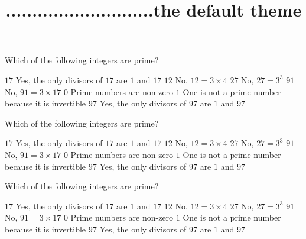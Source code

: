 \documentclass[theme=default]{webquiz}
\title{............................the default theme}
\begin{document}
  \begin{question}     %
     Which of the following integers are prime?
     \begin{choice}[multiple, columns=3]
       \correct   $17$ \feedback Yes, the only divisors of $17$ are $1$ and $17$
       \incorrect $12$ \feedback No, $12 = 3\times 4$
       \incorrect $27$ \feedback No, $27=3^3$
       \incorrect $91$ \feedback No, $91 = 3\times 17$
       \incorrect  $0$ \feedback Prime numbers are non-zero
       \incorrect  $1$ \feedback One is not a prime number because it is invertible
       \correct   $97$ \feedback Yes, the only divisors of $97$ are $1$ and $97$
     \end{choice}
  \end{question}

  \begin{question}     %
     Which of the following integers are prime?
     \begin{choice}[multiple, columns=3]
       \correct   $17$ \feedback Yes, the only divisors of $17$ are $1$ and $17$
       \incorrect $12$ \feedback No, $12 = 3\times 4$
       \incorrect $27$ \feedback No, $27=3^3$
       \incorrect $91$ \feedback No, $91 = 3\times 17$
       \incorrect  $0$ \feedback Prime numbers are non-zero
       \incorrect  $1$ \feedback One is not a prime number because it is invertible
       \correct   $97$ \feedback Yes, the only divisors of $97$ are $1$ and $97$
     \end{choice}
  \end{question}

  \begin{question}     %
     Which of the following integers are prime?
     \begin{choice}[multiple, columns=3]
       \correct   $17$ \feedback Yes, the only divisors of $17$ are $1$ and $17$
       \incorrect $12$ \feedback No, $12 = 3\times 4$
       \incorrect $27$ \feedback No, $27=3^3$
       \incorrect $91$ \feedback No, $91 = 3\times 17$
       \incorrect  $0$ \feedback Prime numbers are non-zero
       \incorrect  $1$ \feedback One is not a prime number because it is invertible
       \correct   $97$ \feedback Yes, the only divisors of $97$ are $1$ and $97$
     \end{choice}
  \end{question}
\end{document}
